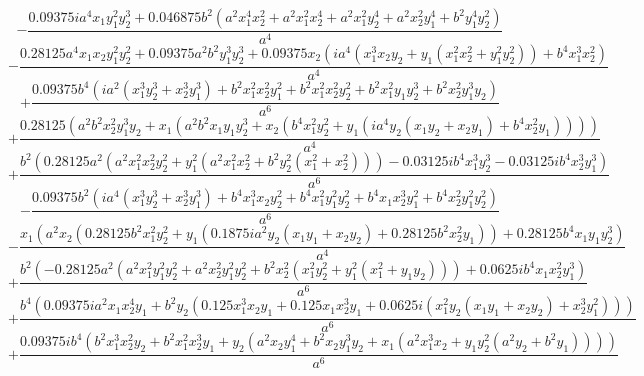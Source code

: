 $$- \frac{0.09375 i a^{4} x_{1} y_{1}^{2} y_{2}^{3} + 0.046875 b^{2} \left(a^{2} x_{1}^{4} x_{2}^{2} + a^{2} x_{1}^{2} x_{2}^{4} + a^{2} x_{1}^{2} y_{2}^{4} + a^{2} x_{2}^{2} y_{1}^{4} + b^{2} y_{1}^{4} y_{2}^{2}\right)}{a^{4}}$$
$$- \frac{0.28125 a^{4} x_{1} x_{2} y_{1}^{2} y_{2}^{2} + 0.09375 a^{2} b^{2} y_{1}^{3} y_{2}^{3} + 0.09375 x_{2} \left(i a^{4} \left(x_{1}^{3} x_{2} y_{2} + y_{1} \left(x_{1}^{2} x_{2}^{2} + y_{1}^{2} y_{2}^{2}\right)\right) + b^{4} x_{1}^{3} x_{2}^{2}\right)}{a^{4}}$$
$$+\frac{0.09375 b^{4} \left(i a^{2} \left(x_{1}^{3} y_{2}^{3} + x_{2}^{3} y_{1}^{3}\right) + b^{2} x_{1}^{2} x_{2}^{2} y_{1}^{2} + b^{2} x_{1}^{2} x_{2}^{2} y_{2}^{2} + b^{2} x_{1}^{2} y_{1} y_{2}^{3} + b^{2} x_{2}^{2} y_{1}^{3} y_{2}\right)}{a^{6}}$$
$$+\frac{0.28125 \left(a^{2} b^{2} x_{2}^{2} y_{1}^{3} y_{2} + x_{1} \left(a^{2} b^{2} x_{1} y_{1} y_{2}^{3} + x_{2} \left(b^{4} x_{1}^{2} y_{2}^{2} + y_{1} \left(i a^{4} y_{2} \left(x_{1} y_{2} + x_{2} y_{1}\right) + b^{4} x_{2}^{2} y_{1}\right)\right)\right)\right)}{a^{4}}$$
$$+\frac{b^{2} \left(0.28125 a^{2} \left(a^{2} x_{1}^{2} x_{2}^{2} y_{2}^{2} + y_{1}^{2} \left(a^{2} x_{1}^{2} x_{2}^{2} + b^{2} y_{2}^{2} \left(x_{1}^{2} + x_{2}^{2}\right)\right)\right) - 0.03125 i b^{4} x_{1}^{3} y_{2}^{3} - 0.03125 i b^{4} x_{2}^{3} y_{1}^{3}\right)}{a^{6}}$$
$$- \frac{0.09375 b^{2} \left(i a^{4} \left(x_{1}^{3} y_{2}^{3} + x_{2}^{3} y_{1}^{3}\right) + b^{4} x_{1}^{3} x_{2} y_{2}^{2} + b^{4} x_{1}^{2} y_{1}^{2} y_{2}^{2} + b^{4} x_{1} x_{2}^{3} y_{1}^{2} + b^{4} x_{2}^{2} y_{1}^{2} y_{2}^{2}\right)}{a^{6}}$$
$$- \frac{x_{1} \left(a^{2} x_{2} \left(0.28125 b^{2} x_{1}^{2} y_{2}^{2} + y_{1} \left(0.1875 i a^{2} y_{2} \left(x_{1} y_{1} + x_{2} y_{2}\right) + 0.28125 b^{2} x_{2}^{2} y_{1}\right)\right) + 0.28125 b^{4} x_{1} y_{1} y_{2}^{3}\right)}{a^{4}}$$
$$+\frac{b^{2} \left(- 0.28125 a^{2} \left(a^{2} x_{1}^{2} y_{1}^{2} y_{2}^{2} + a^{2} x_{2}^{2} y_{1}^{2} y_{2}^{2} + b^{2} x_{2}^{2} \left(x_{1}^{2} y_{2}^{2} + y_{1}^{2} \left(x_{1}^{2} + y_{1} y_{2}\right)\right)\right) + 0.0625 i b^{4} x_{1} x_{2}^{2} y_{1}^{3}\right)}{a^{6}}$$
$$+\frac{b^{4} \left(0.09375 i a^{2} x_{1} x_{2}^{4} y_{1} + b^{2} y_{2} \left(0.125 x_{1}^{3} x_{2} y_{1} + 0.125 x_{1} x_{2}^{3} y_{1} + 0.0625 i \left(x_{1}^{2} y_{2} \left(x_{1} y_{1} + x_{2} y_{2}\right) + x_{2}^{3} y_{1}^{2}\right)\right)\right)}{a^{6}}$$
$$+\frac{0.09375 i b^{4} \left(b^{2} x_{1}^{3} x_{2}^{2} y_{2} + b^{2} x_{1}^{2} x_{2}^{3} y_{1} + y_{2} \left(a^{2} x_{2} y_{1}^{4} + b^{2} x_{2} y_{1}^{3} y_{2} + x_{1} \left(a^{2} x_{1}^{3} x_{2} + y_{1} y_{2}^{2} \left(a^{2} y_{2} + b^{2} y_{1}\right)\right)\right)\right)}{a^{6}}$$
